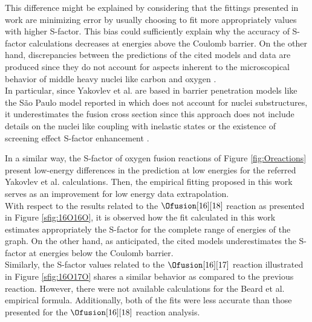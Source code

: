 \documentclass[openany]{book}
\begin{document}

This difference might be explained by considering that the fittings presented in work are minimizing error by usually choosing to fit more appropriately values with higher S-factor. This bias could sufficiently explain why the accuracy of S-factor calculations decreases at energies above the Coulomb barrier. On the other hand, discrepancies between the predictions of the cited models and data are produced since they do not account for aspects inherent to the microscopical behavior of middle heavy nuclei like carbon and oxygen  \cite{duarte_gasques_oliveira_zagatto_chamon_medina_added_seale_alcantara-nunez_rossi_et_2015}. \\

In particular,  since Yakovlev et al. are based in barrier penetration models like the São Paulo model reported in \cite{yakovlev_beard_gasques_wiescher_2010} which does not account for nuclei substructures, it underestimates the fusion cross section since this approach does not include details on the nuclei like coupling with inelastic states or the existence of screening effect S-factor enhancement \cite{koyuncu_soylu_2018}.

In a similar way, the S-factor of oxygen fusion reactions of Figure \ref{fig:Oreactions} present low-energy differences in the prediction at low energies for the referred Yakovlev et al. calculations. Then, the empirical fitting proposed in this work serves as an improvement for low energy data extrapolation. \\

With respect to the results related to the $\Ofusion[16][18]$ reaction as presented in Figure \ref{sfig:16O16O}, it is observed how the fit calculated in this work estimates appropriately the S-factor for the complete range of energies of the graph. On the other hand, as anticipated, the cited models underestimates the S-factor at energies below the Coulomb barrier. \\

Similarly, the S-factor values related to the $\Ofusion[16][17]$ reaction illustrated in Figure  \ref{sfig:16O17O} shares a similar behavior as compared to the previous reaction. However, there were not available calculations for the Beard et al. empirical formula. Additionally, both of the fits were less accurate than those presented for the $\Ofusion[16][18]$  reaction analysis. \\
\end{document}
